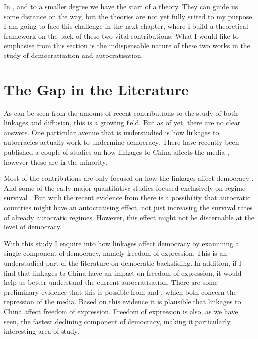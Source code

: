 In \citet{tansey_ties_2017}, and to a smaller degree \citet{levitsky_linkage_2006} we have the start of a theory. They can guide us some distance on the way, but the theories are not yet fully suited to my purpose. I am going to face this challenge in the next chapter, where I build a theoretical framework on the back of these two vital contributions. What I would like to emphasise from this section is the indispensable nature of these two works in the study of democratisation and autocratisation. 

\section{The Gap in the Literature}
As can be seen from the amount of recent contributions to the study of both linkages and diffusion, this is a growing field. But as of yet, there are no clear answers. One particular avenue that is understudied is how linkages to autocracies actually work to undermine democracy. There have recently been published a couple of studies on how linkages to China affects the media \citep{gamso_is_2021, toettoe_foreign_2023}, however these are in the minority.

Most of the contributions are only focused on how the linkages affect democracy \citep{bader_china_2015, levitsky_linkage_2006, risse_democracy_2015, tansey_ties_2017, weyland_autocratic_2017}. And some of the early major quantitative studies focused exclusively on regime survival \citep{bader_china_2015, tansey_ties_2017}. But with the recent evidence from \citep{gamso_is_2021, toettoe_foreign_2023} there is a possibility that autocratic countries might have an autocratising effect, not just increasing the survival rates of already autocratic regimes. However, this effect might not be discernable at the level of democracy. 

With this study I enquire into how linkages affect democracy by examining a single component of democracy, namely freedom of expression. This is an understudied part of the literature on democratic backsliding. In addition, if I find that linkages to China have an impact on freedom of expression, it would help us better understand the current autocratisation. There are some preliminary evidence that this is possible from \citet{gamso_is_2021} and \citet{toettoe_foreign_2023}, which both concern the repression of the media. Based on this evidence it is plausible that linkages to China affect freedom of expression. Freedom of expression is also, as we have seen, the fastest declining component of democracy, making it particularly interesting area of study. 

